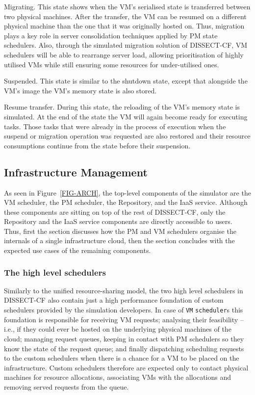 \documentclass[sort, compress, 5p]{elsarticle}
\begin{document}
\begin{description*}
\item[Migrating.] This state shows when the VM's serialised state is transferred between two physical machines. After the transfer, the VM can be resumed on a different physical machine than the one that it was originally hosted on. Thus, migration plays a key role in server consolidation techniques applied by PM state schedulers. Also, through the simulated migration solution of DISSECT-CF, VM schedulers will be able to rearrange server load, allowing prioritisation of highly utilised VMs while still ensuring some resources for under-utilised ones.
\item[Suspended.] This state is similar to the shutdown state, except that alongside the VM's image the VM's memory state is also stored.
\item[Resume transfer.] During this state, the reloading of the VM's memory state is simulated. At the end of the state the VM will again become ready for executing tasks. Those tasks that were already in the process of execution when the suspend or migration operation was requested are also restored and their resource consumptions continue from the state before their suspension.
\end{description*}


\subsection{Infrastructure Management} \label{Sec-IM}

As seen in Figure~\ref{FIG-ARCH}, the top-level components of the simulator are the VM scheduler, the PM scheduler, the Repository, and the IaaS service. Although these components are sitting on top of the rest of DISSECT-CF, only the Repository and the IaaS service components are directly accessible to users. Thus, first the section discusses how the PM and VM schedulers organise the internals of a single infrastructure cloud, then the section concludes with the expected use cases of the remaining components.

\subsubsection{The high level schedulers} \label{Sec-HLS}

Similarly to the unified resource-sharing model, the two high level schedulers in DISSECT-CF also contain just a high performance foundation of custom schedulers provided by the simulation developers. In case of \verb+VM+ \verb+scheduler+s this foundation is responsible for  receiving VM requests;  analysing their feasibility -- i.e., if they could ever be hosted on the underlying physical machines of the cloud;  managing request queues,  keeping in contact with PM schedulers so they know the state of the request queue; and finally  dispatching scheduling requests to the custom schedulers when there is a chance for a VM to be placed on the infrastructure. Custom schedulers therefore are expected only to contact physical machines for resource allocations, associating VMs with the allocations and removing served requests from the queue.
\end{document}
